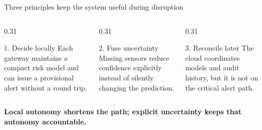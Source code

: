 \begin{frame}{Three principles keep the system useful during disruption}
  \begin{columns}[T,onlytextwidth]
    \begin{column}{0.31\textwidth}
      \begin{block}{1. Decide locally}
        Each gateway maintains a compact risk model and can issue a provisional alert without a round trip.
      \end{block}
    \end{column}
    \begin{column}{0.31\textwidth}
      \begin{block}{2. Fuse uncertainty}
        Missing sensors reduce confidence explicitly instead of silently changing the prediction.
      \end{block}
    \end{column}
    \begin{column}{0.31\textwidth}
      \begin{block}{3. Reconcile later}
        The cloud coordinates models and audit history, but it is not on the critical alert path.
      \end{block}
    \end{column}
  \end{columns}

  \vfill
  \centering
  \color{AstraNavy}\large\bfseries
  Local autonomy shortens the path; explicit uncertainty keeps that autonomy accountable.
\end{frame}
